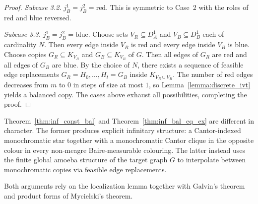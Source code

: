 \begin{proof}
    \medskip
 
    \noindent\textit{Subcase 3.2.}
    $j_B^1=j_B^2=\mathrm{red}$.
    This is symmetric to Case~2 with the roles of red and blue reversed.
 
    \medskip
 
    \noindent\textit{Subcase 3.3.}
    $j_B^1=j_B^2=\mathrm{blue}$.
    Choose sets $V_R\subseteq D_A^1$ and $V_B\subseteq D_B^1$ each of cardinality $N$.
    Then every edge inside $V_R$ is red and every edge inside $V_B$ is blue.
    Choose copies $G_R\subseteq K_{V_R}$ and $G_B\subseteq K_{V_B}$ of $G$.
    Then all edges of $G_R$ are red and all edges of $G_B$ are blue.
    By the choice of $N$, there exists a sequence of feasible edge replacements $G_R=H_0,\dots,H_t=G_B$ inside $K_{V_R\cup V_B}$.
    The number of red edges decreases from $m$ to $0$ in steps of size at most $1$, so Lemma~\ref{lemma:discrete_ivt} yields a balanced copy.
    The cases above exhaust all possibilities, completing the proof.
\end{proof}
 
\begin{remark}
    Theorem~\ref{thm:inf_const_bal} and Theorem~\ref{thm:inf_bal_eq_ex} are different in character.
    The former produces explicit infinitary structure: a Cantor-indexed monochromatic star together with a monochromatic Cantor clique in the opposite colour in every non-meagre Baire-measurable colouring.
    The latter instead uses the finite global amoeba structure of the target graph $G$ to interpolate between monochromatic copies via feasible edge replacements.
 
    Both arguments rely on the localization lemma together with Galvin's theorem and product forms of Mycielski's theorem.
\end{remark}
